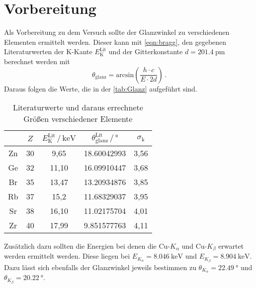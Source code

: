 \section{Vorbereitung}
Als Vorbereitung zu dem Versuch sollte der Glanzwinkel zu verschiedenen Elementen ermittelt werden. Dieser kann mit \autoref{eqn:bragg}, den gegebenen Literaturwerten der 
K-Kante $E_\text{K}^\text{Lit}$ \cite{wissen} und der Gitterkonstante $d = \SI{201.4}{\pico\meter}$ berechnet werden mit 
\begin{equation}
    \theta_\text{glanz} = \text{arcsin}\left(\frac{h \cdot c}{E \cdot 2d}\right) \, .
    \label{eqn:theta}
\end{equation}
\noindent
Daraus folgen die Werte, die in der \autoref{tab:Glanz} aufgeführt sind. 
\begin{table}
    \centering
    \caption{Literaturwerte und daraus errechnete Größen verschiedener Elemente}
    \label{tab:Glanz}
    \begin{tabular}{c c c c c}
    \toprule
    $ $ & $Z$ & $E_\text{K}^\text{Lit} \,/\, \si{\kilo\eV}$
    & $\theta_\text{glanz}^\text{Lit} \,/\, \si{\degree}$ & 
    $\sigma_\text{k}$\\
    \midrule 
    Zn & 30 &  9,65 & 18.60042993 & 3,56 \\
    Ge & 32 & 11,10 & 16.09910447 & 3,68 \\
    Br & 35 & 13,47 & 13.20934876 & 3,85 \\
    Rb & 37 & 15,2 & 11.68329037 & 3,95 \\
    Sr & 38 & 16,10 & 11.02175704 & 4,01 \\
    Zr & 40 & 17,99 &  9.851577763 & 4,11 \\
    \bottomrule
    \end{tabular}
    \end{table}

\noindent
Zusätzlich dazu sollten die Energien bei denen die Cu-$K_\alpha$ und Cu-$K_\beta$ erwartet werden ermittelt werden. Diese liegen bei $E_{K_\alpha} = \SI{8.046}{\kilo\eV}$ und $E_{K_\beta} = \SI{8.904}{\kilo\eV}$.
Dazu lässt sich ebenfalls der Glanzwinkel jeweils bestimmen zu $\theta_{K_\alpha} = \SI{22.49}{\degree}$ und $\theta_{K_\beta} = \SI{20.22}{\degree}$.
